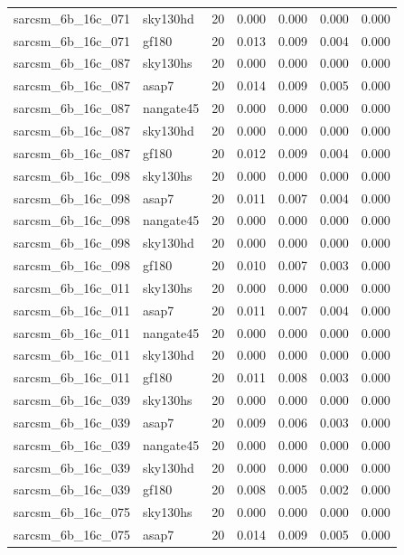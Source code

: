\begin{tabular}{llrrrrr}
sarcsm\_6b\_16c\_071 & sky130hd & 20 & 0.000 & 0.000 & 0.000 & 0.000 \\
sarcsm\_6b\_16c\_071 & gf180 & 20 & 0.013 & 0.009 & 0.004 & 0.000 \\
sarcsm\_6b\_16c\_087 & sky130hs & 20 & 0.000 & 0.000 & 0.000 & 0.000 \\
sarcsm\_6b\_16c\_087 & asap7 & 20 & 0.014 & 0.009 & 0.005 & 0.000 \\
sarcsm\_6b\_16c\_087 & nangate45 & 20 & 0.000 & 0.000 & 0.000 & 0.000 \\
sarcsm\_6b\_16c\_087 & sky130hd & 20 & 0.000 & 0.000 & 0.000 & 0.000 \\
sarcsm\_6b\_16c\_087 & gf180 & 20 & 0.012 & 0.009 & 0.004 & 0.000 \\
sarcsm\_6b\_16c\_098 & sky130hs & 20 & 0.000 & 0.000 & 0.000 & 0.000 \\
sarcsm\_6b\_16c\_098 & asap7 & 20 & 0.011 & 0.007 & 0.004 & 0.000 \\
sarcsm\_6b\_16c\_098 & nangate45 & 20 & 0.000 & 0.000 & 0.000 & 0.000 \\
sarcsm\_6b\_16c\_098 & sky130hd & 20 & 0.000 & 0.000 & 0.000 & 0.000 \\
sarcsm\_6b\_16c\_098 & gf180 & 20 & 0.010 & 0.007 & 0.003 & 0.000 \\
sarcsm\_6b\_16c\_011 & sky130hs & 20 & 0.000 & 0.000 & 0.000 & 0.000 \\
sarcsm\_6b\_16c\_011 & asap7 & 20 & 0.011 & 0.007 & 0.004 & 0.000 \\
sarcsm\_6b\_16c\_011 & nangate45 & 20 & 0.000 & 0.000 & 0.000 & 0.000 \\
sarcsm\_6b\_16c\_011 & sky130hd & 20 & 0.000 & 0.000 & 0.000 & 0.000 \\
sarcsm\_6b\_16c\_011 & gf180 & 20 & 0.011 & 0.008 & 0.003 & 0.000 \\
sarcsm\_6b\_16c\_039 & sky130hs & 20 & 0.000 & 0.000 & 0.000 & 0.000 \\
sarcsm\_6b\_16c\_039 & asap7 & 20 & 0.009 & 0.006 & 0.003 & 0.000 \\
sarcsm\_6b\_16c\_039 & nangate45 & 20 & 0.000 & 0.000 & 0.000 & 0.000 \\
sarcsm\_6b\_16c\_039 & sky130hd & 20 & 0.000 & 0.000 & 0.000 & 0.000 \\
sarcsm\_6b\_16c\_039 & gf180 & 20 & 0.008 & 0.005 & 0.002 & 0.000 \\
sarcsm\_6b\_16c\_075 & sky130hs & 20 & 0.000 & 0.000 & 0.000 & 0.000 \\
sarcsm\_6b\_16c\_075 & asap7 & 20 & 0.014 & 0.009 & 0.005 & 0.000 \\

\end{tabular}

